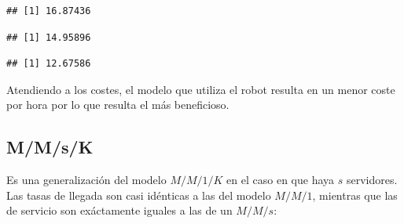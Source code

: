\documentclass[
]{book}
\newenvironment{Shaded}{\begin{snugshade}}{\end{snugshade}}
\newcommand{\CommentTok}[1]{\textcolor[rgb]{0.56,0.35,0.01}{\textit{#1}}}
\newcommand{\DecValTok}[1]{\textcolor[rgb]{0.00,0.00,0.81}{#1}}
\newcommand{\FloatTok}[1]{\textcolor[rgb]{0.00,0.00,0.81}{#1}}
\newcommand{\NormalTok}[1]{#1}
\newcommand{\SpecialCharTok}[1]{\textcolor[rgb]{0.00,0.00,0.00}{#1}}
\theoremstyle{definition}
\theoremstyle{definition}
\theoremstyle{definition}
\theoremstyle{definition}
\theoremstyle{remark}
\begin{document}
\begin{Shaded}
\end{Shaded}

\begin{verbatim}
## [1] 16.87436
\end{verbatim}

\begin{Shaded}
\end{Shaded}

\begin{verbatim}
## [1] 14.95896
\end{verbatim}

\begin{Shaded}
\end{Shaded}

\begin{verbatim}
## [1] 12.67586
\end{verbatim}

Atendiendo a los costes, el modelo que utiliza el robot resulta en un menor coste por hora por lo que resulta el más beneficioso.

\hypertarget{mmsk}{%
\subsection{M/M/s/K}\label{mmsk}}

Es una generalización del modelo \(M/M/1/K\) en el caso en que haya \(s\) servidores. Las tasas de llegada son casi idénticas a las del modelo \(M/M/1\), mientras que las de servicio son exáctamente iguales a las de un \(M/M/s\):
\end{document}
